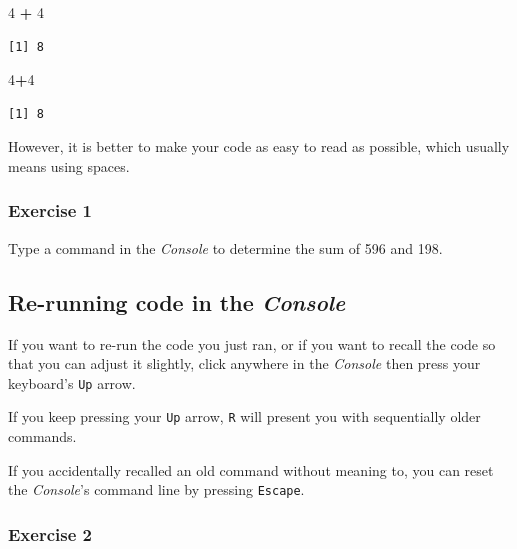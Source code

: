\documentclass[
]{book}
\newenvironment{Shaded}{\begin{snugshade}}{\end{snugshade}}
\newcommand{\DecValTok}[1]{\textcolor[rgb]{0.00,0.00,0.81}{#1}}
\newcommand{\OperatorTok}[1]{\textcolor[rgb]{0.81,0.36,0.00}{\textbf{#1}}}
\newcommand{\StringTok}[1]{\textcolor[rgb]{0.31,0.60,0.02}{#1}}
\begin{document}
\begin{Shaded}
\begin{Highlighting}[]
\DecValTok{4} \OperatorTok{+}\StringTok{ }\DecValTok{4}
\end{Highlighting}
\end{Shaded}

\begin{verbatim}
[1] 8
\end{verbatim}

\begin{Shaded}
\begin{Highlighting}[]
\DecValTok{4}\OperatorTok{+}\DecValTok{4}
\end{Highlighting}
\end{Shaded}

\begin{verbatim}
[1] 8
\end{verbatim}

However, it is better to make your code as easy to read as possible, which usually means using spaces.

\hypertarget{exercise-1}{%
\subsubsection*{Exercise 1}\label{exercise-1}}

Type a command in the \emph{Console} to determine the sum of 596 and 198.

\hypertarget{re-running-code-in-the-console}{%
\subsection*{\texorpdfstring{Re-running code in the \emph{Console}}{Re-running code in the Console}}\label{re-running-code-in-the-console}}

If you want to re-run the code you just ran, or if you want to recall the code so that you can adjust it slightly, click anywhere in the \emph{Console} then press your keyboard's \texttt{Up} arrow.

If you keep pressing your \texttt{Up} arrow, \texttt{R} will present you with sequentially older commands.

If you accidentally recalled an old command without meaning to, you can reset the \emph{Console}'s command line by pressing \texttt{Escape}.

\hypertarget{exercise-2}{%
\subsubsection*{Exercise 2}\label{exercise-2}}
\end{document}
